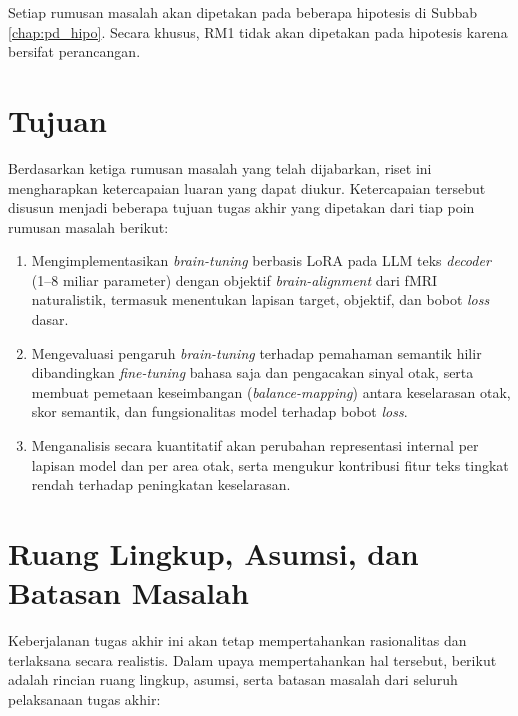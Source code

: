 Setiap rumusan masalah akan dipetakan pada beberapa hipotesis di Subbab \ref{chap:pd_hipo}. Secara khusus, RM1 tidak akan dipetakan pada hipotesis karena bersifat perancangan.

\section{Tujuan}
Berdasarkan ketiga rumusan masalah yang telah dijabarkan, riset ini mengharapkan ketercapaian luaran yang dapat diukur. Ketercapaian tersebut disusun menjadi beberapa tujuan tugas akhir yang dipetakan dari tiap poin rumusan masalah berikut:
\begin{enumerate}
    \item Mengimplementasikan \textit{brain-tuning} berbasis LoRA pada LLM teks \textit{decoder} (1--8 miliar parameter) dengan objektif \textit{brain-alignment} dari fMRI naturalistik, termasuk menentukan lapisan target, objektif, dan bobot \textit{loss} dasar.
    \item Mengevaluasi pengaruh \textit{brain-tuning} terhadap pemahaman semantik hilir dibandingkan \textit{fine-tuning} bahasa saja dan pengacakan sinyal otak, serta membuat pemetaan keseimbangan (\textit{balance-mapping}) antara keselarasan otak, skor semantik, dan fungsionalitas model terhadap bobot \textit{loss}.
    \item Menganalisis secara kuantitatif akan perubahan representasi internal per lapisan model dan per area otak, serta mengukur kontribusi fitur teks tingkat rendah terhadap peningkatan keselarasan.
\end{enumerate}

\section{Ruang Lingkup, Asumsi, dan Batasan Masalah}
Keberjalanan tugas akhir ini akan tetap mempertahankan rasionalitas dan terlaksana secara realistis. Dalam upaya mempertahankan hal tersebut, berikut adalah rincian ruang lingkup, asumsi, serta batasan masalah dari seluruh pelaksanaan tugas akhir:

